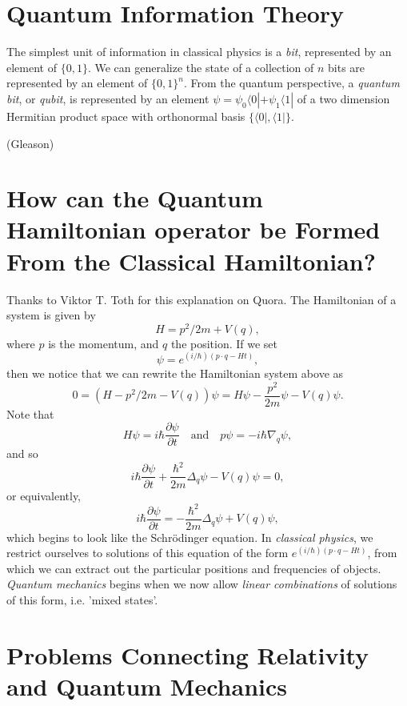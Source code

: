 \chapter{Quantum Information Theory}

The simplest unit of information in classical physics is a \emph{bit}, represented by an element of $\{ 0, 1 \}$. We can generalize the state of a collection of $n$ bits are represented by an element of $\{ 0, 1 \}^n$. From the quantum perspective, a \emph{quantum bit}, or \emph{qubit}, is represented by an element $\psi = \psi_0 \langle 0 | + \psi_1 \langle 1 |$ of a two dimension Hermitian product space with orthonormal basis $\{ \langle 0 |, \langle 1 | \}$.

(Gleason)





\chapter{How can the Quantum Hamiltonian operator be Formed From the Classical Hamiltonian?}

Thanks to Viktor T. Toth for this explanation on Quora. The Hamiltonian of a system is given by
%
\[ H = p^2/2m + V(q), \]
%
where $p$ is the momentum, and $q$ the position. If we set
%
\[ \psi = e^{(i / \hbar) (p \cdot q - Ht)}, \]
%
then we notice that we can rewrite the Hamiltonian system above as
%
\[ 0 = (H - p^2/2m - V(q)) \psi = H \psi - \frac{p^2}{2m} \psi - V(q) \psi. \]
%
Note that
%
\[ H \psi = i \hbar \frac{\partial \psi}{\partial t} \quad\text{and}\quad p \psi = - i \hbar \nabla_q \psi, \]
and so
%
\[ i \hbar \frac{\partial \psi}{\partial t} + \frac{\hbar^2}{2m} \Delta_q \psi - V(q) \psi = 0, \]
%
or equivalently,
%
\[ i\hbar \frac{\partial \psi}{\partial t} = - \frac{\hbar^2}{2m} \Delta_q \psi + V(q) \psi, \]
%
which begins to look like the Schr\"{o}dinger equation. In \emph{classical physics}, we restrict ourselves to solutions of this equation of the form $e^{(i / \hbar)(p \cdot q - Ht)}$, from which we can extract out the particular positions and frequencies of objects. \emph{Quantum mechanics} begins when we now allow \emph{linear combinations} of solutions of this form, i.e. 'mixed states'.


\chapter{Problems Connecting Relativity and Quantum Mechanics}

